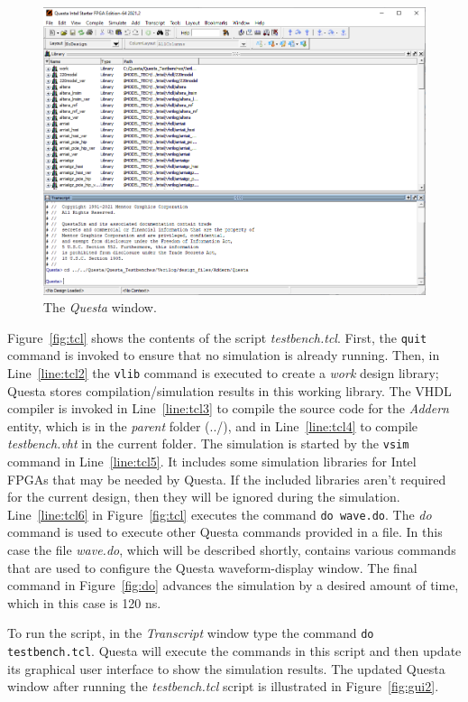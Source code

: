\documentclass[11pt, twoside, pdftex]{article}
\begin{document}
\begin{figure}[bh!]
	\begin{center}
		\includegraphics[width = .9\textwidth]{figures/gui1.png}
	\end{center}
		  \caption{The {\it Questa} window.}
	\label{fig:gui1}
\end{figure}

\noindent
Figure~\ref{fig:tcl} shows the contents of the script {\it testbench.tcl}. First, the
\texttt{quit} command is invoked to ensure that no simulation is already running. Then, in
Line~\ref{line:tcl2} the \texttt{vlib} command is executed to create a {\it work} design
library; Questa stores compilation/simulation results in this working library.   
The VHDL compiler is invoked in Line~\ref{line:tcl3} to
compile the source code for the {\it Addern} entity, which is in the {\it parent} folder (../),  
and in Line~\ref{line:tcl4} to compile {\it testbench.vht} in the current folder.
The simulation is started by the \texttt{vsim} command in Line~\ref{line:tcl5}. It includes some
simulation libraries for Intel FPGAs that may be needed by Questa.
If the included libraries aren't required for the current
design, then they will be ignored during the simulation. 
Line~\ref{line:tcl6} in Figure~\ref{fig:tcl} executes the command \texttt{do~wave.do}.
The {\it do} command is used to execute other Questa commands provided in a file. In
this case the file {\it wave.do}, which will be described shortly, contains various commands
that are used to configure the Questa waveform-display window. The final command in Figure~\ref{fig:do}
advances the simulation by a desired amount of time, which in this case is 120 ns.

\noindent
To run the script, in the {\it Transcript} window type the command
\texttt{do testbench.tcl}. Questa will execute the commands in this script and then
update its graphical user interface to show the simulation results. 
The updated Questa window after running the {\it testbench.tcl} script is illustrated 
in Figure~\ref{fig:gui2}.
\end{document}
